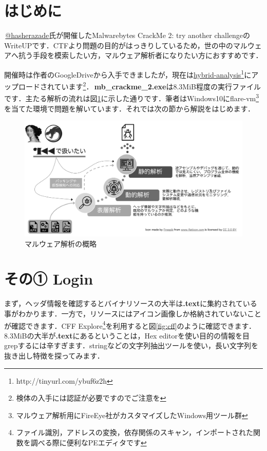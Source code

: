 \section{はじめに}
\faTwitterSquare \,\href{https://twitter.com/hasherezade}{@hasherazade}氏が開催したMalwarebytes CrackMe 2: try another challengeのWriteUPです．CTFより問題の目的がはっきりしているため，世の中のマルウェアへ抗う手段を模索したい方，マルウェア解析者になりたい方におすすめです．

開催時は作者のGoogleDriveから入手できましたが，現在は\href{http://tinyurl.com/ybuf6z2h}{hybrid-analysis}\footnote{http://tinyurl.com/ybuf6z2h}にアップロードされています\footnote{検体の入手には認証が必要ですのでご注意を}．\faFileCodeO \,\textbf{mb\_crackme\_2.exe}は8.3MiB程度の実行ファイルです．主たる解析の流れは図\ref{fig:malware_analysis}に示した通りです．筆者はWindows10にflare-vm\footnote{マルウェア解析用にFireEye社がカスタマイズしたWindows用ツール群}を当てた環境で問題を解いています．それでは次の節から解説をはじめます．
\begin{figure}[H]
    \centering
    \includegraphics[width=0.85\linewidth]{./assets/takuzoo3868asset/flow_gray.png}
    \caption{マルウェア解析の概略}
    \label{fig:malware_analysis}
\end{figure}

\section{その① Login}
まず，ヘッダ情報を確認するとバイナリソースの大半は\textbf{.text}に集約されている事がわかります．一方で，リソースにはアイコン画像しか格納されていないことが確認できます．CFF Explore\footnote{ファイル識別，アドレスの変換，依存関係のスキャン，インポートされた関数を調べる際に便利なPEエディタです}を利用すると図\ref{fig:cff}のように確認できます．8.3MiBの大半が\textbf{.text}にあるということは，Hex editorを使い目的の情報を目grepするには辛すぎます．stringなどの文字列抽出ツールを使い，長い文字列を抜き出し特徴を探ってみます．

